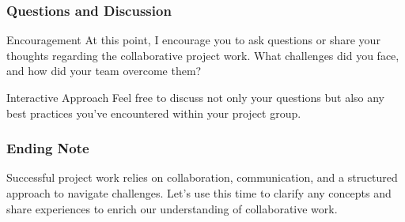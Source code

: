 \documentclass[aspectratio=169]{beamer}
\begin{document}
\begin{frame}[fragile]
    \frametitle{Questions and Discussion}
    \begin{block}{Encouragement}
        At this point, I encourage you to ask questions or share your thoughts regarding the collaborative project work. What challenges did you face, and how did your team overcome them?
    \end{block}

    \begin{block}{Interactive Approach}
        Feel free to discuss not only your questions but also any best practices you’ve encountered within your project group.
    \end{block}
\end{frame}

\begin{frame}[fragile]
    \frametitle{Ending Note}
    Successful project work relies on collaboration, communication, and a structured approach to navigate challenges. Let’s use this time to clarify any concepts and share experiences to enrich our understanding of collaborative work.
\end{frame}
\end{document}
